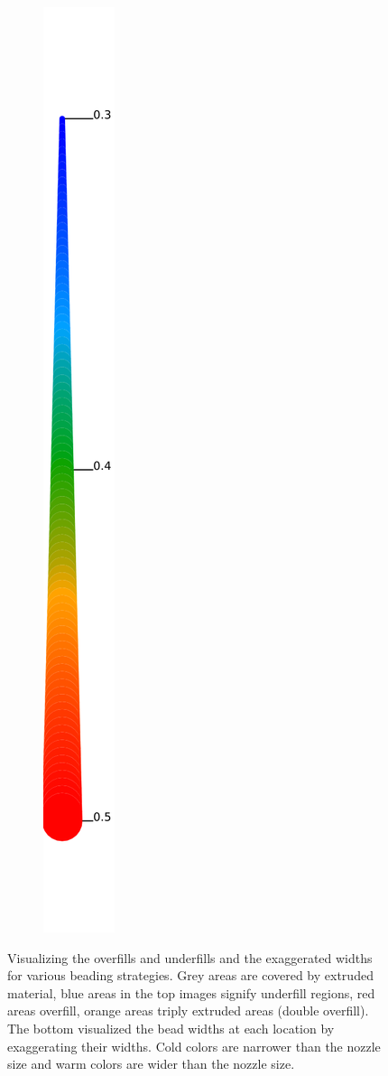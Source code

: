 \begin{figure}
\begin{subfigure}{.04\columnwidth}
\includegraphics[height=\figheight]{sources/validation/gMAT_example/widths_legend.png}
\end{subfigure}
\caption{
Visualizing the overfills and underfills and the exaggerated widths for various beading strategies.
Grey areas are covered by extruded material,
blue areas in the top images signify underfill regions,
red areas overfill,
orange areas triply extruded areas (double overfill).
The bottom visualized the bead widths at each location by exaggerating their widths.
Cold colors are narrower than the nozzle size and warm colors are wider than the nozzle size.
}
\label{visualized_accuracy}
\end{figure}


